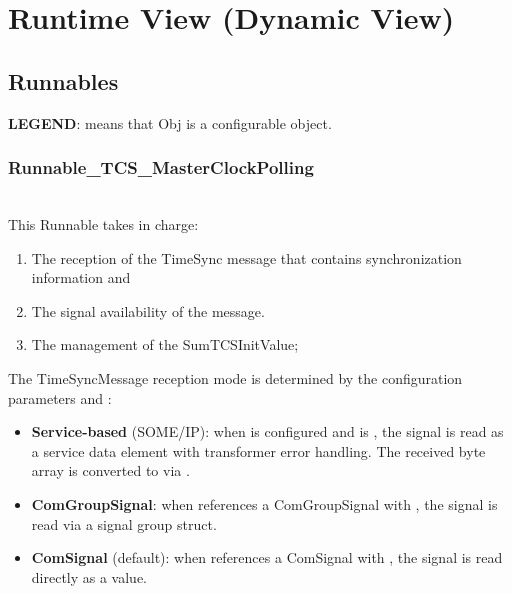 \chapter{Runtime View (Dynamic View)}

\section{Runnables}
\textbf{LEGEND}:  means that Obj is a configurable object.

\subsection{Runnable_TCS_MasterClockPolling}
\label{subsec:Runnable_TCS_MasterClockPolling}

\\
This Runnable takes in charge:
\begin{enumerate}
	\item The reception of the TimeSync message that contains synchronization information and
	\item The signal availability of the message.
	\item The management of the SumTCSInitValue;
\end{enumerate}

The TimeSyncMessage reception mode is determined by the configuration parameters  and :
\begin{itemize}
	\item \textbf{Service-based} (SOME/IP): when  is configured and  is , the signal is read as a service data element with transformer error handling. The received byte array is converted to  via .
	\item \textbf{ComGroupSignal}: when  references a ComGroupSignal with  , the signal is read via a signal group struct.
	\item \textbf{ComSignal} (default): when  references a ComSignal with  , the signal is read directly as a  value.
\end{itemize}
{   }

